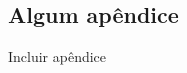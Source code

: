 \begin{apendicesenv}

\partapendices

\chapter{Algum apêndice}

Incluir apêndice

\end{apendicesenv}